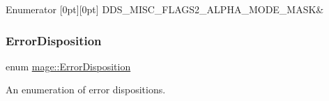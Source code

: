 \begin{DoxyEnumFields}{Enumerator}
[0pt][0pt]{}\hypertarget{namespacemage_a0943eceedce2e66b3b66d0566b15c712af6954b93e1e18fa5366ebb55d65ecbcf}{}\label{namespacemage_a0943eceedce2e66b3b66d0566b15c712af6954b93e1e18fa5366ebb55d65ecbcf} 
D\+D\+S\+\_\+\+M\+I\+S\+C\+\_\+\+F\+L\+A\+G\+S2\+\_\+\+A\+L\+P\+H\+A\+\_\+\+M\+O\+D\+E\+\_\+\+M\+A\+SK&\\
\hline

\end{DoxyEnumFields}
\hypertarget{namespacemage_a7146b3c3db53179eeb32bf4d51934715}{}\label{namespacemage_a7146b3c3db53179eeb32bf4d51934715} 
\subsubsection{\texorpdfstring{Error\+Disposition}{ErrorDisposition}}
{\footnotesize\ttfamily enum \hyperlink{namespacemage_a7146b3c3db53179eeb32bf4d51934715}{mage\+::\+Error\+Disposition}\hspace{0.3cm}{\ttfamily [strong]}}

An enumeration of error dispositions.

